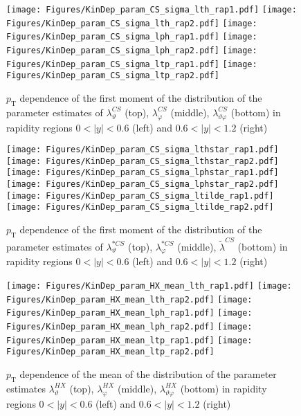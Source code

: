 \documentclass[12pt]{article}
\newcommand{\pT}{p_\mathrm{T}}
\newcommand{\absy}{\left |  y \right |}
\newcommand{\lamthCS}{\lambda^{\scriptscriptstyle CS}_\vartheta}
\newcommand{\lamphCS}{\lambda^{\scriptscriptstyle CS}_\varphi}
\newcommand{\lamthphCS}{\lambda^{\scriptscriptstyle CS}_{\vartheta \varphi}}
\newcommand{\lamtildeCS}{\tilde{\lambda}^{\scriptscriptstyle CS}}
\newcommand{\lamthstarCS}{\lambda^{* \scriptscriptstyle CS}_\vartheta}
\newcommand{\lamphstarCS}{\lambda^{* \scriptscriptstyle CS}_\varphi}
\newcommand{\lamthHX}{\lambda^{\scriptscriptstyle HX}_\vartheta}
\newcommand{\lamphHX}{\lambda^{\scriptscriptstyle HX}_\varphi}
\newcommand{\lamthphHX}{\lambda^{\scriptscriptstyle HX}_{\vartheta \varphi}}
\begin{document}
\begin{figure}[htbp]
\centering
\texttt{[image: Figures/KinDep\_param\_CS\_sigma\_lth\_rap1.pdf]}
\texttt{[image: Figures/KinDep\_param\_CS\_sigma\_lth\_rap2.pdf]}
\texttt{[image: Figures/KinDep\_param\_CS\_sigma\_lph\_rap1.pdf]}
\texttt{[image: Figures/KinDep\_param\_CS\_sigma\_lph\_rap2.pdf]}
\texttt{[image: Figures/KinDep\_param\_CS\_sigma\_ltp\_rap1.pdf]}
\texttt{[image: Figures/KinDep\_param\_CS\_sigma\_ltp\_rap2.pdf]}
\caption{$\pT$ dependence of the first moment of the distribution of the parameter estimates of $\lamthCS$ (top), $\lamphCS$ (middle), $\lamthphCS$ (bottom) in rapidity regions $0<\absy<0.6$ (left) and $0.6<\absy<1.2$ (right)}
\end{figure}
\clearpage

\begin{figure}[htbp]
\centering
\texttt{[image: Figures/KinDep\_param\_CS\_sigma\_lthstar\_rap1.pdf]}
\texttt{[image: Figures/KinDep\_param\_CS\_sigma\_lthstar\_rap2.pdf]}
\texttt{[image: Figures/KinDep\_param\_CS\_sigma\_lphstar\_rap1.pdf]}
\texttt{[image: Figures/KinDep\_param\_CS\_sigma\_lphstar\_rap2.pdf]}
\texttt{[image: Figures/KinDep\_param\_CS\_sigma\_ltilde\_rap1.pdf]}
\texttt{[image: Figures/KinDep\_param\_CS\_sigma\_ltilde\_rap2.pdf]}
\caption{$\pT$ dependence of the first moment of the distribution of the parameter estimates of $\lamthstarCS$ (top), $\lamphstarCS$ (middle), $\lamtildeCS$ (bottom) in rapidity regions $0<\absy<0.6$ (left) and $0.6<\absy<1.2$ (right)}
\end{figure}
\clearpage









\begin{figure}[htbp]
\centering
\texttt{[image: Figures/KinDep\_param\_HX\_mean\_lth\_rap1.pdf]}
\texttt{[image: Figures/KinDep\_param\_HX\_mean\_lth\_rap2.pdf]}
\texttt{[image: Figures/KinDep\_param\_HX\_mean\_lph\_rap1.pdf]}
\texttt{[image: Figures/KinDep\_param\_HX\_mean\_lph\_rap2.pdf]}
\texttt{[image: Figures/KinDep\_param\_HX\_mean\_ltp\_rap1.pdf]}
\texttt{[image: Figures/KinDep\_param\_HX\_mean\_ltp\_rap2.pdf]}
\caption{$\pT$ dependence of the mean of the distribution of the parameter estimates $\lamthHX$ (top), $\lamphHX$ (middle), $\lamthphHX$ (bottom) in rapidity regions $0<\absy<0.6$ (left) and $0.6<\absy<1.2$ (right)}
\end{figure}
\clearpage
\end{document}
